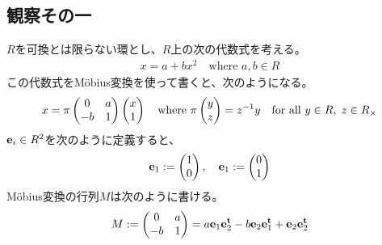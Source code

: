 {\subsection{観察その一}\label{s2:観察その一} %
	$R$を可換とは限らない環とし、$R$上の次の代数式を考える。
	\begin{equation*}\begin{split}
		x = a + bx^2 \quad\text{where } a,b\in R
	\end{split}\end{equation*}
	この代数式をM\"{o}bius変換を使って書くと、次のようになる。
	\begin{equation*}\begin{split}
		x = \pi \begin{pmatrix}
			0 & a \\ - b & 1
		\end{pmatrix}\begin{pmatrix}{x}\\{1}\end{pmatrix}
		\quad\text{where } \pi\begin{pmatrix}{y}\\{z}\end{pmatrix} = z^{-1}y
		\quad\text{for all } y\in R,\; z\in R_\times
	\end{split}\end{equation*}
	${{\mathbf e}_{i}}\in R^2$を次のように定義すると、
	\begin{equation*}\begin{split}
		{{\mathbf e}_{1}} := \begin{pmatrix}{1}\\{0}\end{pmatrix},\quad {{\mathbf e}_{1}} := \begin{pmatrix}{0}\\{1}\end{pmatrix}
	\end{split}\end{equation*}
	M\"{o}bius変換の行列$M$は次のように書ける。
	\begin{equation*}\begin{split}
		M := \begin{pmatrix}
			0 & a \\ - b & 1
		\end{pmatrix} = a{{\mathbf e}_{1}{\mathbf e}_{2}^{\mathbf{t}}} - b{{\mathbf e}_{2}{\mathbf e}_{1}^{\mathbf{t}}} + {{\mathbf e}_{2}{\mathbf e}_{2}^{\mathbf{t}}}
	\end{split}\end{equation*}
}
